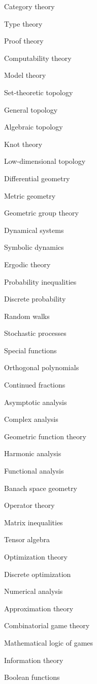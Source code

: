 \item Category theory
\item Type theory
\item Proof theory
\item Computability theory
\item Model theory
\item Set-theoretic topology
\item General topology
\item Algebraic topology
\item Knot theory
\item Low-dimensional topology
\item Differential geometry
\item Metric geometry
\item Geometric group theory
\item Dynamical systems
\item Symbolic dynamics
\item Ergodic theory
\item Probability inequalities
\item Discrete probability
\item Random walks
\item Stochastic processes
\item Special functions
\item Orthogonal polynomials
\item Continued fractions
\item Asymptotic analysis
\item Complex analysis
\item Geometric function theory
\item Harmonic analysis
\item Functional analysis
\item Banach space geometry
\item Operator theory
\item Matrix inequalities
\item Tensor algebra
\item Optimization theory
\item Discrete optimization
\item Numerical analysis
\item Approximation theory
\item Combinatorial game theory
\item Mathematical logic of games
\item Information theory
\item Boolean functions
